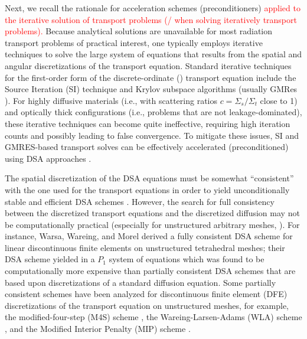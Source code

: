 
Next, we recall the rationale for acceleration schemes (preconditioners) 
\textcolor{red}{applied to the iterative solution of
transport problems (/ when solving iteratively transport problems).}
Because analytical solutions are unavailable for most
radiation transport problems of practical interest, one typically employs
iterative techniques to solve the large system of equations that results from
the spatial and angular discretizations of the transport equation. Standard
iterative techniques for the first-order form of the discrete-ordinate (\sn)
transport equation include the Source Iteration (SI) technique and Krylov 
subspace algorithms (usually GMRes \cite{gmres}). For highly diffusive materials 
(i.e., with scattering ratios $c=\Sigma_s / \Sigma_t $ close to 1) and optically 
thick configurations (i.e., problems that are not leakage-dominated), these iterative techniques 
can become quite ineffective, requiring high iteration counts and possibly 
leading to false convergence. To mitigate these issues, SI and GMRES-based transport solves 
can be effectively accelerated (preconditioned) using DSA approaches 
\cite{dsa_ref,larsen_dsa,consistent_p1,m4s,wla,mip}. 

The spatial discretization of the DSA equations
must be somewhat ``consistent'' with the one used for the \sn transport equations 
in order to yield unconditionally stable and efficient DSA schemes
\cite{dsa_ref,larsen_dsa,consistent_p1,m4s,wla,mip}. However, the search for full
consistency between the discretized transport equations and the discretized
diffusion may not be computationally practical (especially for unstructured
arbitrary meshes, \cite{dsa_ref}). For instance, Warsa, Wareing, and
Morel \cite{consistent_p1} derived a fully consistent DSA scheme for linear
discontinuous finite elements on unstructured tetrahedral meshes; their DSA
scheme yielded in a $P_1$ system of equations which was found to be
computationally more expensive than partially consistent DSA schemes that are
based upon discretizations of a standard diffusion equation. Some partially 
consistent schemes have been analyzed for discontinuous finite element
(DFE) discretizations of the transport equation on unstructured meshes, for
example, the modified-four-step (M4S) scheme \cite{m4s}, the
Wareing-Larsen-Adams (WLA) scheme \cite{wla}, and the Modified Interior
Penalty (MIP) scheme \cite{mip}.

